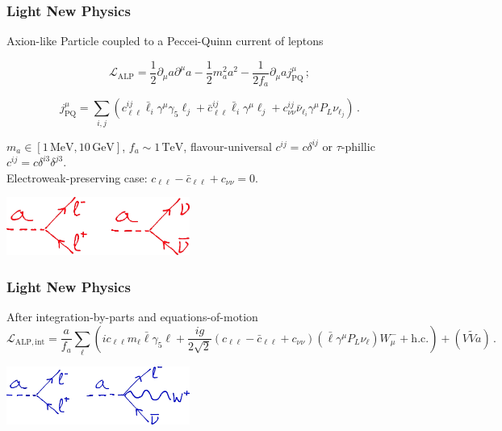 \documentclass[mathserif, 10pt, aspectratio=169]{beamer}
\begin{document}
\begin{frame}\frametitle{Light New Physics}
    Axion-like Particle coupled to a Peccei-Quinn current of leptons

    $$\mathcal{L}_\mathrm{ALP} = \frac{1}{2}\partial_\mu a \partial^\mu a - \frac{1}{2} m_a^2 a^2 - \frac{1}{2 f_a}\partial_\mu a j^\mu_\mathrm{PQ}\,;$$

    $$j^\mu_\mathrm{PQ} = \sum_{i,j} \left( c_{\ell\ell}^{ij} \bar{\ell}_i\gamma^\mu \gamma_5 \ell_j + \bar{c}_{\ell\ell}^{ij} \bar{\ell}_i\gamma^\mu  \ell_j  + c_{\nu\nu}^{ij} \bar{\nu}_{\ell_i} \gamma^\mu P_L \nu_{\ell_j} \right)\,. $$

    $m_a \in [1\,\mathrm{MeV}, 10\,\mathrm{GeV}]$, $f_a \sim 1\,\mathrm{TeV}$, flavour-universal $c^{ij} = c \delta^{ij}$ or $\tau$-phillic $c^{ij} = c \delta^{i3}\delta^{j3}$.\\


    Electroweak-preserving case: $c_{\ell\ell} - \bar{c}_{\ell\ell} + c_{\nu\nu}=0$.
    \begin{center}
        \includegraphics[width=0.45\textwidth]{figures/rules_derbasis.png}
    \end{center}
\end{frame}

\begin{frame}\frametitle{Light New Physics}
    After integration-by-parts and equations-of-motion
    $$\mathcal{L}_\mathrm{ALP, int} = \frac{a}{f_a}\sum_\ell \left(i c_{\ell\ell}m_\ell \bar{\ell}\gamma_5\ell  + \frac{ig}{2 \sqrt{2}} (c_{\ell\ell} - \bar{c}_{\ell\ell} + c_{\nu\nu}) (\bar{\ell}\gamma^\mu P_L \nu_\ell) W^-_\mu + \mathrm{h.c.} \right) + (V\tilde{V}a)\,.$$
    \vspace{10pt}
    \begin{center}
        \includegraphics[width=0.45\textwidth]{figures/rules_Yukbasis.png}
    \end{center}
\end{frame}
\end{document}
